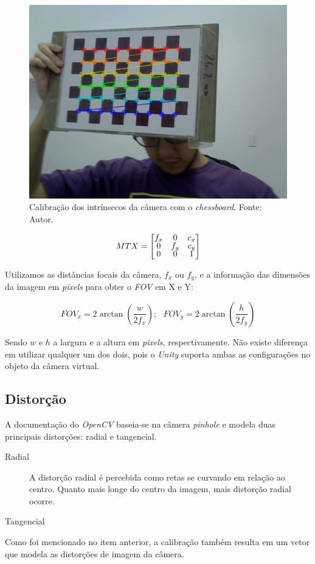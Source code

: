 \begin{figure}[ht]
    \centering
    \includegraphics[width=.45\linewidth]{figuras/chessboard.png}
    \caption{Calibração dos intrínsecos da câmera com o \textit{chessboard}. Fonte: Autor.}
    \label{fig:chess_calib}
\end{figure}

\[ MTX = 
\renewcommand\arraystretch{.8}
\begin{bmatrix}
    f_x & 0 & c_x \\
    0 & f_y & c_y \\
    0 & 0 & 1
\end{bmatrix} \]

Utilizamos as distâncias focais da câmera, \(f_x\) ou \(f_y\), e a informação das dimensões da imagem em \textit{pixels} para obter o \textit{FOV} em X e Y: 

\[
FOV_x = 2 \arctan \left( \dfrac{w}{2f_x} \right) ;
\ \ \ FOV_y = 2 \arctan \left( \dfrac{h}{2f_y} \right) 
\]
    
Sendo \(w\) e \(h\) a largura e a altura em \textit{pixels}, respectivamente. Não existe diferença em utilizar qualquer um dos dois, pois o \textit{Unity} suporta ambas as configurações no objeto da câmera virtual.
    
\subsection{Distorção}

A documentação do \textit{OpenCV} baseia-se na câmera \textit{pinhole} e modela duas principais distorções: radial e tangencial. 

\begin{description}
    \item[Radial] A distorção radial é percebida como retas se curvando em relação ao centro. Quanto mais longe do centro da imagem, mais distorção radial ocorre.
    \item[Tangencial] 
\end{description}
Como foi mencionado no item anterior, a calibração também resulta em um vetor que modela as distorções de imagem da câmera. 


